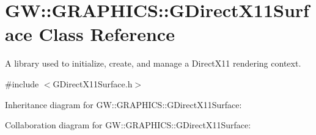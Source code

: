 \hypertarget{classGW_1_1GRAPHICS_1_1GDirectX11Surface}{}\section{GW\+::G\+R\+A\+P\+H\+I\+CS\+::G\+Direct\+X11\+Surface Class Reference}
\label{classGW_1_1GRAPHICS_1_1GDirectX11Surface}


A library used to initialize, create, and manage a Direct\+X11 rendering context.  




{\ttfamily \#include $<$G\+Direct\+X11\+Surface.\+h$>$}



Inheritance diagram for GW\+::G\+R\+A\+P\+H\+I\+CS\+::G\+Direct\+X11\+Surface\+:


Collaboration diagram for GW\+::G\+R\+A\+P\+H\+I\+CS\+::G\+Direct\+X11\+Surface\+:
